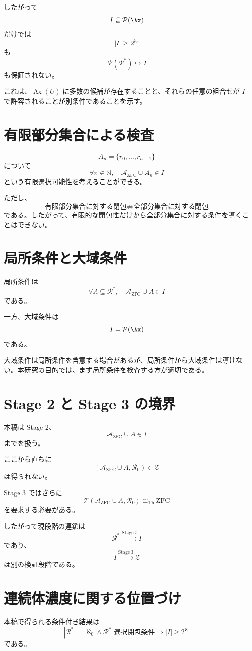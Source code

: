 \documentclass[a4paper,11pt]{ltjsarticle}
\begin{document}
したがって
\[
I\subseteq\mathcal{P}(\Ax)
\]
だけでは
\[
|I|\ge2^{\aleph_0}
\]
も
\[
\mathcal{P}(\mathcal{R}^*)\hookrightarrow I
\]
も保証されない。

これは、$\operatorname{Ax}(U)$ に多数の候補が存在することと、それらの任意の組合せが $I$ で許容されることが別条件であることを示す。

\section{有限部分集合による検査}
\[
A_n=\{r_0,\ldots,r_{n-1}\}
\]
について
\[
\forall n\in\mathbb N,\quad
\mathcal{A}_{\mathrm{ZFC}}\cup A_n\in I
\]
という有限選択可能性を考えることができる。

ただし、
\[
\text{有限部分集合に対する閉包}
\not\Rightarrow
\text{全部分集合に対する閉包}
\]
である。したがって、有限的な閉包性だけから全部分集合に対する条件を導くことはできない。

\section{局所条件と大域条件}
局所条件は
\[
\forall A\subseteq\mathcal{R}^*,
\quad
\mathcal{A}_{\mathrm{ZFC}}\cup A\in I
\]
である。

一方、大域条件は
\[
I=\mathcal{P}(\Ax)
\]
である。

大域条件は局所条件を含意する場合があるが、局所条件から大域条件は導けない。本研究の目的では、まず局所条件を検査する方が適切である。

\section{Stage 2 と Stage 3 の境界}
本稿は Stage 2、
\[
\mathcal{A}_{\mathrm{ZFC}}\cup A\in I
\]
までを扱う。

ここから直ちに
\[
(\mathcal{A}_{\mathrm{ZFC}}\cup A,\mathcal{R}_0)\in\mathcal{Z}
\]
は得られない。

Stage 3 ではさらに
\[
\mathcal{T}(\mathcal{A}_{\mathrm{ZFC}}\cup A,\mathcal{R}_0)
\cong_{\mathrm{Th}}\mathrm{ZFC}
\]
を要求する必要がある。

したがって現段階の連鎖は
\[
\mathcal{R}^*\overset{\mathrm{Stage\ 2}}{\longrightarrow}I
\]
であり、
\[
I\overset{\mathrm{Stage\ 3}}{\longrightarrow}\mathcal{Z}
\]
は別の検証段階である。

\section{連続体濃度に関する位置づけ}
本稿で得られる条件付き結果は
\[
|\mathcal{R}^*|=\aleph_0
\land
\text{$\mathcal{R}^*$ 選択閉包条件}
\Longrightarrow
|I|\ge2^{\aleph_0}
\]
である。
\end{document}
